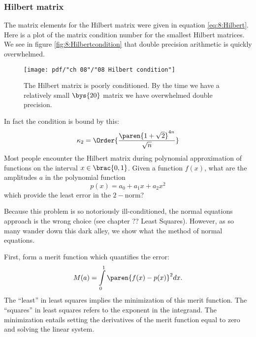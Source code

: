 \subsubsection{Hilbert matrix}
The matrix elements for the Hilbert matrix were given in equation \eqref{eq:8:Hilbert}. Here is a plot of the matrix condition number for the smallest Hilbert matrices. We see in figure \eqref{fig:8:Hilbertcondition} that double precision arithmetic is quickly overwhelmed.
\begin{figure}[htbp] %
   \centering
   \texttt{[image: pdf/"ch 08"/"08 Hilbert condition"]} 
   \caption[The Hilbert matrix is poorly conditioned]{The Hilbert matrix is poorly conditioned. By the time we have a relatively small $\bys{20}$ matrix we have overwhelmed double precision.}
   \label{fig:8:Hilbertcondition}
\end{figure}
In fact the condition is bound by this:
\begin{equation}
  \kappa_{2} = \Order{ \frac{\paren{1 + \sqrt{2}}^{4n}} {\sqrt{n}} }
\end{equation}
Most people encounter the Hilbert matrix during polynomial approximation of functions on the interval $x\in\brac{0,1}$. Given a function $f(x)$, what are the amplitudes $a$ in the polynomial function
\begin{equation}
  p(x) = a_{0} + a_{1}x + a_{2}x^{2}
\end{equation}
which provide the least error in the $2-$norm?

Because this problem is so notoriously ill-conditioned, the normal equations approach is the wrong choice (see chapter ?? Least Squares). However, as so many wander down this dark alley, we show what the method of normal equations.

First, form a merit function which quantifies the error:
\begin{equation}
  M(a) = \int\limits_{0}^{1}{\paren{f(x) - p(x)}^{2}dx}.
\end{equation}
The ``least'' in least squares implies the minimization of this merit function. The ``squares'' in least squares refers to the exponent in the integrand. The minimization entails setting the derivatives of the merit function equal to zero and solving the linear system.

